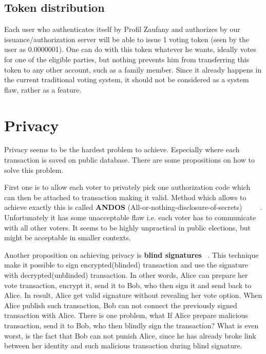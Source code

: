 \documentclass[runningheads]{llncs}
\begin{document}
\subsection{Token distribution}
Each user who authenticates itself by Profil Zaufany and authorizes by our issuance/authorization server will be able to issue 1 voting token (seen by the user as 0.0000001). One can do with this token whatever he wants, ideally votes for one of the eligible parties, but nothing prevents him from transferring this token to any other account, such as a family member. Since it already happens in the current traditional voting system, it should not be considered as a system flaw, rather as a feature.

\section{Privacy} %
Privacy seems to be the hardest problem to achieve. Especially where each transaction is saved on public database. There are some propositions on how to solve this problem. 

First one is to allow each voter to privately pick one authorization code which can then be attached to transaction making it valid. Method which allows to achieve exactly this is called \textbf{ANDOS} (All-or-nothing-disclosure-of-secrets) ~\cite{andos} ~\cite{salomaa1990secret} ~\cite{applied_cryptography}. Unfortunately it has some unacceptable flaw i.e. each voter has to communicate with all other voters. It seems to be highly unpractical in public elections, but might be acceptable in smaller contexts. 

Another proposition on achieving privacy is \textbf{blind signatures} ~\cite{applied_cryptography}. This technique make it possible to sign encrypted(blinded) transaction and use the signature with decrypted(unblinded) transaction. In other words, Alice can prepare her vote transaction, encrypt it, send it to Bob, who then sign it and send back to Alice. In result, Alice get valid signature without revealing her vote option. When Alice publish such transaction, Bob can not connect the previously signed transaction with Alice. 
There is one problem, what If Alice prepare malicious transaction, send it to Bob, who then blindly sign the transaction? What is even worst, is the fact that Bob can not punish Alice, since he has already broke link between her identity and such malicious transaction during blind signature.
\end{document}
